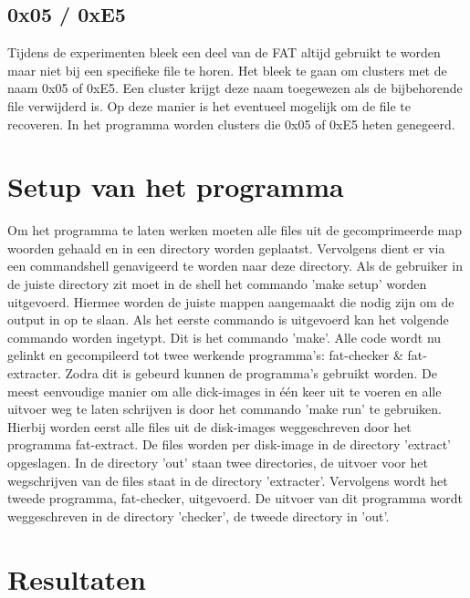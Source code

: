 \documentclass[11pt]{article}
\begin{document}
	\subsection{0x05 / 0xE5}\label{sec:0xE5}
	Tijdens de experimenten bleek een deel van de FAT altijd gebruikt te worden maar niet bij een specifieke file te horen. Het bleek te gaan om clusters met de naam 0x05 of 0xE5. Een cluster krijgt deze naam toegewezen als de bijbehorende file verwijderd is. Op deze manier is het eventueel mogelijk om de file te recoveren. In het programma worden clusters die 0x05 of 0xE5 heten genegeerd. 

	\section{Setup van het programma}\label{sec:setup}
	Om het programma te laten werken moeten alle files uit de gecomprimeerde map woorden gehaald en in een directory worden geplaatst. Vervolgens dient er via een commandshell genavigeerd te worden naar deze directory. Als de gebruiker in de juiste directory zit moet in de shell het commando 'make setup' worden uitgevoerd. 
Hiermee worden de juiste mappen aangemaakt die nodig zijn om de output in op te slaan. Als het eerste commando is uitgevoerd kan het volgende commando worden ingetypt. Dit is het commando 'make'. Alle code wordt nu gelinkt en gecompileerd tot twee werkende programma's: fat-checker \& fat-extracter. Zodra dit is gebeurd kunnen de programma's gebruikt worden. De meest eenvoudige manier om alle dick-images in \'e\'en keer uit te voeren en alle uitvoer weg te laten schrijven is door het commando 'make run' te gebruiken. Hierbij worden eerst alle files uit de disk-images weggeschreven door het programma fat-extract. De files worden per disk-image in de directory 'extract' opgeslagen. In de directory 'out' staan twee directories, de uitvoer voor het wegschrijven van de files staat in de directory 'extracter'.
Vervolgens wordt het tweede programma, fat-checker, uitgevoerd. De uitvoer van dit programma wordt weggeschreven in de directory 'checker', de tweede directory in 'out'.
	
	\newpage

	\section{Resultaten}\label{sec:result}
	
\end{document}
